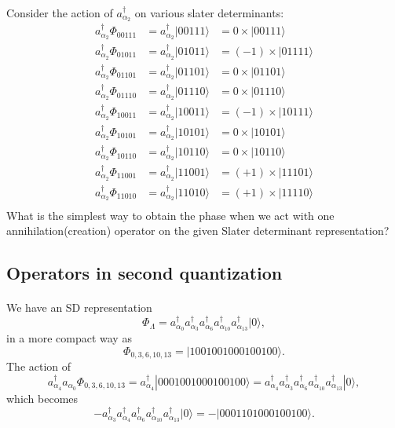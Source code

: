 \documentclass[%
twoside,                 %
final,                   %
10pt]{article}
\begin{document}
\paragraph{}
Consider the action of $a^{\dagger}_{\alpha_2}$ on various slater determinants:
\[
\begin{array}{ccc}
a^{\dagger}_{\alpha_2}\Phi_{00111}& = a^{\dagger}_{\alpha_2}|00111\rangle&=0\times |00111\rangle\\
a^{\dagger}_{\alpha_2}\Phi_{01011}& = a^{\dagger}_{\alpha_2}|01011\rangle&=(-1)\times |01111\rangle\\
a^{\dagger}_{\alpha_2}\Phi_{01101}& = a^{\dagger}_{\alpha_2}|01101\rangle&=0\times |01101\rangle\\
a^{\dagger}_{\alpha_2}\Phi_{01110}& = a^{\dagger}_{\alpha_2}|01110\rangle&=0\times |01110\rangle\\
a^{\dagger}_{\alpha_2}\Phi_{10011}& = a^{\dagger}_{\alpha_2}|10011\rangle&=(-1)\times |10111\rangle\\
a^{\dagger}_{\alpha_2}\Phi_{10101}& = a^{\dagger}_{\alpha_2}|10101\rangle&=0\times |10101\rangle\\
a^{\dagger}_{\alpha_2}\Phi_{10110}& = a^{\dagger}_{\alpha_2}|10110\rangle&=0\times |10110\rangle\\
a^{\dagger}_{\alpha_2}\Phi_{11001}& = a^{\dagger}_{\alpha_2}|11001\rangle&=(+1)\times |11101\rangle\\
a^{\dagger}_{\alpha_2}\Phi_{11010}& = a^{\dagger}_{\alpha_2}|11010\rangle&=(+1)\times |11110\rangle\\
\end{array}
\]
What is the simplest way to obtain the phase when we act with one annihilation(creation) operator
on the given Slater determinant representation?




\subsection*{Operators in second quantization}

\paragraph{}
We have an SD representation
\[
\Phi_{\Lambda} = a_{\alpha_0}^{\dagger} a_{\alpha_3}^{\dagger} a_{\alpha_6}^{\dagger} a_{\alpha_{10}}^{\dagger} a_{\alpha_{13}}^{\dagger} |0\rangle,
\]
in a more compact way as
\[
\Phi_{0,3,6,10,13} = |1001001000100100\rangle.
\]
The action of
\[
a^{\dagger}_{\alpha_4}a_{\alpha_0}\Phi_{0,3,6,10,13} = a^{\dagger}_{\alpha_4}|0001001000100100\rangle=a^{\dagger}_{\alpha_4}a_{\alpha_3}^{\dagger} a_{\alpha_6}^{\dagger} a_{\alpha_{10}}^{\dagger} a_{\alpha_{13}}^{\dagger} |0\rangle,
\]
which becomes
\[
-a_{\alpha_3}^{\dagger} a^{\dagger}_{\alpha_4} a_{\alpha_6}^{\dagger} a_{\alpha_{10}}^{\dagger} a_{\alpha_{13}}^{\dagger} |0\rangle=-|0001101000100100\rangle.
\]
\end{document}
